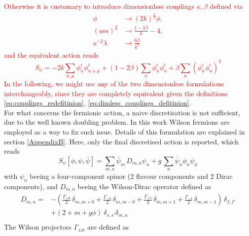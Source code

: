 \textcolor{red}{Otherwise it is customary to introduce dimensionless couplings $\kappa, \beta$ defined via
\begin{equation}
    \begin{aligned}
       \phi & \rightarrow(2 k)^{\frac{1}{2}} \phi, \\
        (a m)^2 & \rightarrow \frac{1-2 \beta}{k}-4, \\
        a^{-2} \lambda & \rightarrow \frac{6 \beta}{k^2}
    \end{aligned}
    \label{eq:dimless_couplings_defitinion}
\end{equation}
and the equivalent action reads
\begin{equation*}
    S_{\phi}=-2 k \sum_{n, \mu} \phi_n^i \phi_{n+\mu}^i+(1-2 \beta) \sum_n \phi_n^i \phi_n^i+\beta \sum_n\left(\phi_n^i \phi_n^i\right)^2
\end{equation*}
In the following, we might use any of the two dimensionless formulations interchangeably, since they are completely equivalent given the definitions \eqref{eq:couplings_redefitinion}, \eqref{eq:dimless_couplings_defitinion}.} \\
For what concerns the fermionic action, a naive discretisation is not sufficient, due to the well known doubling problem. In this work Wilson fermions are employed as a way to fix such issue. Details of this formulation are explained in section \ref{AppendixB}. Here, only the final discretised action is reported, which reads
\begin{equation*}
    S_\psi[\phi, \psi, \bar\psi] = \sum_{m,n} \bar\psi_m \, D_{m,n} \psi_n + g \, \sum_n \bar\psi_n \phi_n \psi_n
\end{equation*}
with $\psi_n$ beeing a four-component spinor (2 flavour components and 2 Dirac components), and $D_{m,n}$ beeing the Wilson-Dirac operator  defined as 
\begin{equation}
    \begin{aligned}
    D_{m, n} = &- \left(\frac{\Gamma_{+0}}{2} \, \delta_{m, m+0} +\frac{\Gamma_{-0}}{2} \, \delta_{m, m-0} + \frac{\Gamma_{+1}}{2} \, \delta_{m, m+1} + \frac{\Gamma_{-1}}{2} \, \delta_{m, m-1}\right) \, \delta _{f, f'} \\
     &+ \left(2 + m + g\phi\right) \ \delta_{s,s'} \delta_{m,n} \\
    \end{aligned}
    \label{eq:wilson-dirac_operator}
\end{equation}
The Wilson projectors $\Gamma_{\pm \mu}$ are defined as
